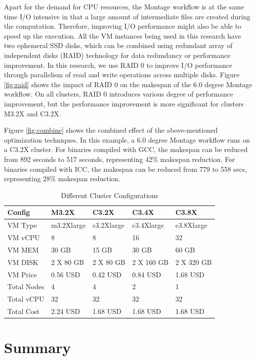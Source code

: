 Apart for the demand for CPU resources, the Montage workflow is at the same time I/O intensive in that a large amount of intermediate files are created during the computation. Therefore, improving I/O performance might also be able to speed up the execution. All the VM instances being used in this research have two ephemeral SSD disks, which can be combined using redundant array of independent disks (RAID) technology for data redundancy or performance improvement. In this research, we use RAID 0  to improve I/O performance through parallelism of read and write operations across multiple disks. Figure \ref{fig:raid} shows the impact of RAID 0 on the makespan of the 6.0 degree Montage workflow. On all clusters, RAID 0 introduces various degree of performance improvement, but the performance improvement is more significant for clusters M3.2X and C3.2X.

Figure \ref{fig:combine} shows the combined effect of the above-mentioned optimization techniques. In this example, a 6.0 degree Montage workflow runs on a C3.2X cluster. For binaries compiled with GCC, the makespan can be reduced from 892 seconds to 517 seconds, representing 42\% makespan reduction. For binaries compiled with ICC, the makespan can be reduced from 779 to 558 secs, representing 28\% makespan reduction. 

\begin{table}[t!]
\caption{Different Cluster Configurations}
\label{tbl:cluster}
\centering
\begin{tabular}{|p{3.0cm}|p{3.0cm}|p{3.0cm}|p{3.0cm}|p{3.0cm}|}
\hline
Config & M3.2X & C3.2X & C3.4X& C3.8X\\ \hline
VM Type & m3.2Xlarge & c3.2Xlarge & c3.4Xlarge& c3.8Xlarge\\ \hline
VM vCPU & 8 & 8 & 16 & 32 \\ \hline
VM MEM & 30 GB & 15 GB & 30 GB & 60 GB \\ \hline
VM DISK & 2 X 80 GB & 2 X 80 GB & 2 X 160 GB & 2 X 320 GB \\ \hline
VM Price & 0.56 USD & 0.42 USD & 0.84 USD & 1.68 USD \\ \hline
Total Nodes & 4 & 4 & 2 & 1 \\ \hline
Total vCPU & 32 & 32 & 32 & 32 \\ \hline
Total Cost & 2.24 USD & 1.68 USD & 1.68 USD& 1.68 USD\\ \hline
\end{tabular}
\end{table}


\section{Summary}
\label{v1_sec:summary}

